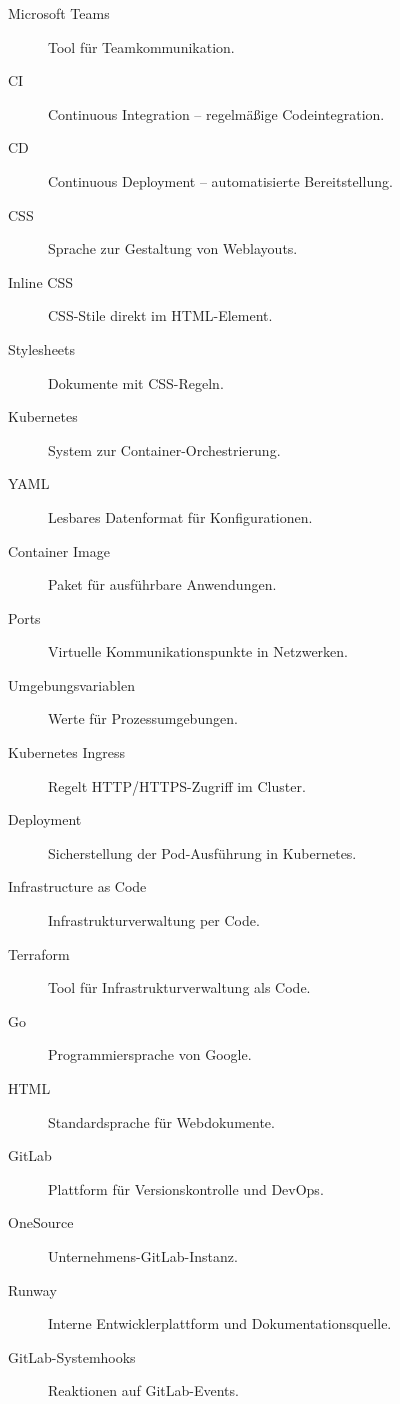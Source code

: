 \begin{description}
    \item[\hypertarget{MicrosoftTeams}{Microsoft Teams}] Tool für Teamkommunikation.
    \item[\hypertarget{CI}{CI}] Continuous Integration – regelmäßige Codeintegration.
    \item[\hypertarget{CD}{CD}] Continuous Deployment – automatisierte Bereitstellung.
    \item[\hypertarget{CSS}{CSS}] Sprache zur Gestaltung von Weblayouts.
    \item[\hypertarget{InlineCSS}{Inline CSS}] CSS-Stile direkt im HTML-Element.
    \item[\hypertarget{Stylesheets}{Stylesheets}] Dokumente mit CSS-Regeln.
    \item[\hypertarget{Kubernetes}{Kubernetes}] System zur Container-Orchestrierung.
    \item[\hypertarget{YAML}{YAML}] Lesbares Datenformat für Konfigurationen.
    \item[\hypertarget{ContainerImage}{Container Image}] Paket für ausführbare Anwendungen.
    \item[\hypertarget{Ports}{Ports}] Virtuelle Kommunikationspunkte in Netzwerken.
    \item[\hypertarget{Umgebungsvariablen}{Umgebungsvariablen}] Werte für Prozessumgebungen.
    \item[\hypertarget{KubernetesIngress}{Kubernetes Ingress}] Regelt HTTP/HTTPS-Zugriff im Cluster.
    \item[\hypertarget{Deployment}{Deployment}] Sicherstellung der Pod-Ausführung in Kubernetes.
    \item[\hypertarget{InfrastructureAsCode}{Infrastructure as Code}] Infrastrukturverwaltung per Code.
    \item[\hypertarget{Terraform}{Terraform}] Tool für Infrastrukturverwaltung als Code.
    \item[\hypertarget{Go}{Go}] Programmiersprache von Google.
    \item[\hypertarget{HTML}{HTML}] Standardsprache für Webdokumente.
    \item[\hypertarget{GitLab}{GitLab}] Plattform für Versionskontrolle und DevOps.
    \item[\hypertarget{OneSource}{OneSource}] Unternehmens-GitLab-Instanz.
    \item[\hypertarget{Runway}{Runway}] Interne Entwicklerplattform und Dokumentationsquelle.
    \item[\hypertarget{GitLabSystemhooks}{GitLab-Systemhooks}] Reaktionen auf GitLab-Events.

\end{description}
